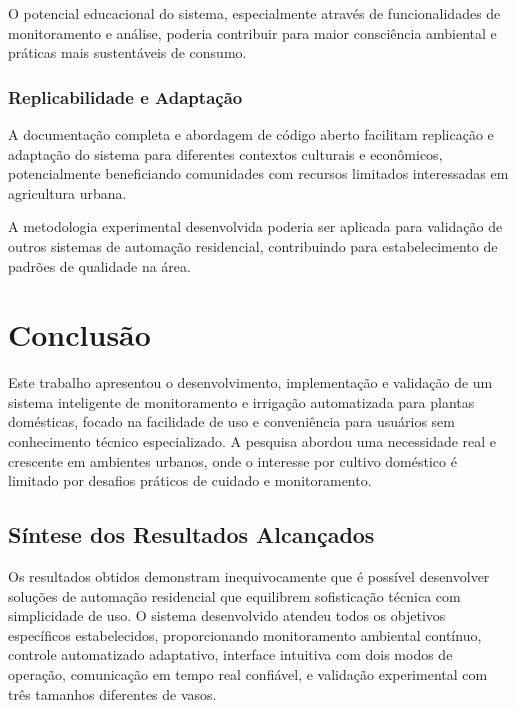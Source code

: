 O potencial educacional do sistema, especialmente através de funcionalidades de monitoramento e análise, poderia contribuir para maior consciência ambiental e práticas mais sustentáveis de consumo.

\subsection{Replicabilidade e Adaptação}

A documentação completa e abordagem de código aberto facilitam replicação e adaptação do sistema para diferentes contextos culturais e econômicos, potencialmente beneficiando comunidades com recursos limitados interessadas em agricultura urbana.

A metodologia experimental desenvolvida poderia ser aplicada para validação de outros sistemas de automação residencial, contribuindo para estabelecimento de padrões de qualidade na área.

\chapter{Conclusão}

Este trabalho apresentou o desenvolvimento, implementação e validação de um sistema inteligente de monitoramento e irrigação automatizada para plantas domésticas, focado na facilidade de uso e conveniência para usuários sem conhecimento técnico especializado. A pesquisa abordou uma necessidade real e crescente em ambientes urbanos, onde o interesse por cultivo doméstico é limitado por desafios práticos de cuidado e monitoramento.

\section{Síntese dos Resultados Alcançados}

Os resultados obtidos demonstram inequivocamente que é possível desenvolver soluções de automação residencial que equilibrem sofisticação técnica com simplicidade de uso. O sistema desenvolvido atendeu todos os objetivos específicos estabelecidos, proporcionando monitoramento ambiental contínuo, controle automatizado adaptativo, interface intuitiva com dois modos de operação, comunicação em tempo real confiável, e validação experimental com três tamanhos diferentes de vasos.

